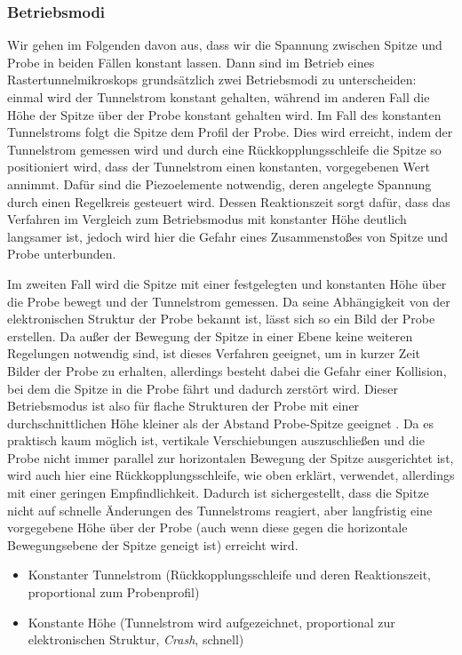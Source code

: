 \documentclass[10pt, a4paper]{article}
\begin{document}
\subsubsection{Betriebsmodi}
\label{sec:betriebsmodi}
Wir gehen im Folgenden davon aus, dass wir die Spannung zwischen Spitze und Probe in beiden Fällen konstant lassen.
Dann sind im Betrieb eines Rastertunnelmikroskops grundsätzlich zwei Betriebsmodi zu unterscheiden:
einmal wird der Tunnelstrom konstant gehalten, während im anderen Fall die Höhe der Spitze über der Probe konstant gehalten wird.
Im Fall des konstanten Tunnelstroms folgt die Spitze dem Profil der Probe.
Dies wird erreicht, indem der Tunnelstrom gemessen wird und durch eine Rückkopplungsschleife die Spitze so positioniert wird, dass der Tunnelstrom einen konstanten, vorgegebenen Wert annimmt.
Dafür sind die Piezoelemente notwendig, deren angelegte Spannung durch einen Regelkreis gesteuert wird.
Dessen Reaktionszeit sorgt dafür, dass das Verfahren im Vergleich zum Betriebsmodus mit konstanter Höhe deutlich langsamer ist, jedoch wird hier die Gefahr eines Zusammenstoßes von Spitze und Probe  unterbunden.

Im zweiten Fall wird die Spitze mit einer festgelegten und konstanten Höhe über die Probe bewegt und der Tunnelstrom gemessen.
Da seine Abhängigkeit von der elektronischen Struktur der Probe bekannt ist, lässt sich so ein Bild der Probe erstellen.
Da außer der Bewegung der Spitze in einer Ebene keine weiteren Regelungen notwendig sind, ist dieses Verfahren geeignet, um in kurzer Zeit Bilder der Probe zu erhalten, allerdings besteht dabei die Gefahr einer Kollision, bei dem die Spitze in die Probe fährt und dadurch zerstört wird.
Dieser Betriebsmodus ist also für flache Strukturen der Probe mit einer durchschnittlichen Höhe kleiner als der Abstand Probe-Spitze geeignet \cite{colton}.
Da es praktisch kaum möglich ist, vertikale Verschiebungen auszuschließen und die Probe nicht immer parallel zur horizontalen Bewegung der Spitze ausgerichtet ist, wird auch hier eine Rückkopplungsschleife, wie oben erklärt, verwendet, allerdings mit einer geringen Empfindlichkeit. Dadurch ist sichergestellt, dass die Spitze nicht auf schnelle Änderungen des Tunnelstroms reagiert, aber langfristig eine vorgegebene Höhe über der Probe (auch wenn diese gegen die horizontale Bewegungsebene der Spitze geneigt ist) erreicht wird.
 
\begin{itemize}
  \item Konstanter Tunnelstrom (Rückkopplungsschleife und deren Reaktionszeit, proportional zum Probenprofil)
  \item Konstante Höhe (Tunnelstrom wird aufgezeichnet, proportional zur elektronischen Struktur, \emph{Crash}, schnell)
\end{itemize}
\end{document}
